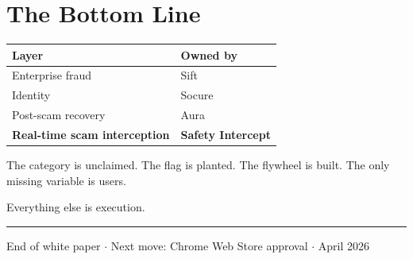 \documentclass[12pt, letterpaper]{article}
\begin{document}
\section{The Bottom Line}

\begin{tabularx}{\linewidth}{lX}
\toprule
\textbf{Layer} & \textbf{Owned by} \\
\midrule
Enterprise fraud & Sift \\
Identity & Socure \\
Post-scam recovery & Aura \\
\textbf{Real-time scam interception} & \textbf{Safety Intercept} \\
\bottomrule
\end{tabularx}

\vspace{1.2em}

The category is unclaimed. The flag is planted. The flywheel is built. The only missing variable is users.

Everything else is execution.

\vspace{2em}
\textcolor{accent}{\rule{\linewidth}{0.6pt}}
\begin{center}
  \textcolor{muted}{\small End of white paper $\cdot$ Next move: Chrome Web Store approval $\cdot$ April 2026}
\end{center}
\end{document}
